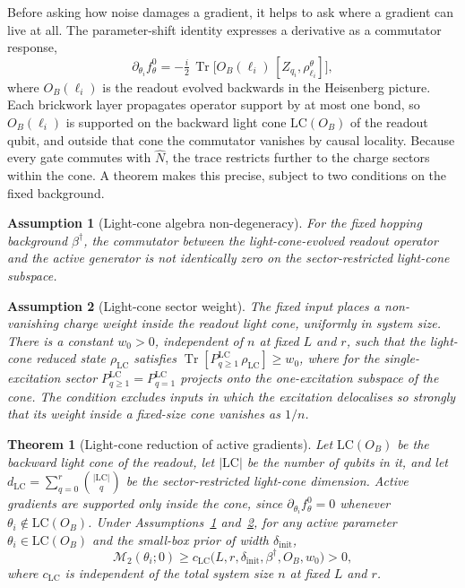 \documentclass[10pt,a4paper]{amsart}
\newtheorem{theorem}{Theorem}
\newtheorem{assumption}{Assumption}
\newcommand{\Mtwo}{\mathcal{M}_2}
\newcommand{\LC}{\mathrm{LC}}
\newcommand{\Tr}{\operatorname{Tr}}
\begin{document}
Before asking how noise damages a gradient, it helps to ask where a gradient can live at all. The parameter-shift identity expresses a derivative as a commutator response,
\begin{equation}
    \partial_{\theta_i}f^0_\theta
    =
    -\tfrac{i}{2}\,\Tr\!\bigl[O_B(\ell_i)\,[Z_{q_i},\rho^\theta_{\ell_i}]\bigr],
    \label{eq:psr}
\end{equation}
where $O_B(\ell_i)$ is the readout evolved backwards in the Heisenberg picture. Each brickwork layer propagates operator support by at most one bond, so $O_B(\ell_i)$ is supported on the backward light cone $\LC(O_B)$ of the readout qubit, and outside that cone the commutator vanishes by causal locality. Because every gate commutes with $\hat N$, the trace restricts further to the charge sectors within the cone. A theorem makes this precise, subject to two conditions on the fixed background.

\begin{assumption}[Light-cone algebra non-degeneracy]\label{ass:nondegen}
For the fixed hopping background $\beta^\dagger$, the commutator between the light-cone-evolved readout operator and the active generator is not identically zero on the sector-restricted light-cone subspace.
\end{assumption}

\begin{assumption}[Light-cone sector weight]\label{ass:weight}
The fixed input places a non-vanishing charge weight inside the readout light cone, uniformly in system size. There is a constant $w_0>0$, independent of $n$ at fixed $L$ and $r$, such that the light-cone reduced state $\rho_{\LC}$ satisfies $\Tr[P^{\LC}_{q\geq1}\,\rho_{\LC}]\geq w_0$, where for the single-excitation sector $P^{\LC}_{q\geq1}=P^{\LC}_{q=1}$ projects onto the one-excitation subspace of the cone. The condition excludes inputs in which the excitation delocalises so strongly that its weight inside a fixed-size cone vanishes as $1/n$.
\end{assumption}

\begin{theorem}[Light-cone reduction of active gradients]\label{thm:locality}
Let $\LC(O_B)$ be the backward light cone of the readout, let $|\LC|$ be the number of qubits in it, and let $d_{\LC}=\sum_{q=0}^{r}\binom{|\LC|}{q}$ be the sector-restricted light-cone dimension. Active gradients are supported only inside the cone, since $\partial_{\theta_i}f^0_\theta=0$ whenever $\theta_i\notin\LC(O_B)$. Under Assumptions~\ref{ass:nondegen} and~\ref{ass:weight}, for any active parameter $\theta_i\in\LC(O_B)$ and the small-box prior of width $\delta_{\mathrm{init}}$,
\begin{equation}
    \Mtwo(\theta_i;0)
    \geq
    c_{\LC}\bigl(L,r,\delta_{\mathrm{init}},\beta^\dagger,O_B,w_0\bigr)
    >0 ,
    \label{eq:lcbound}
\end{equation}
where $c_{\LC}$ is independent of the total system size $n$ at fixed $L$ and $r$.
\end{theorem}
\end{document}
